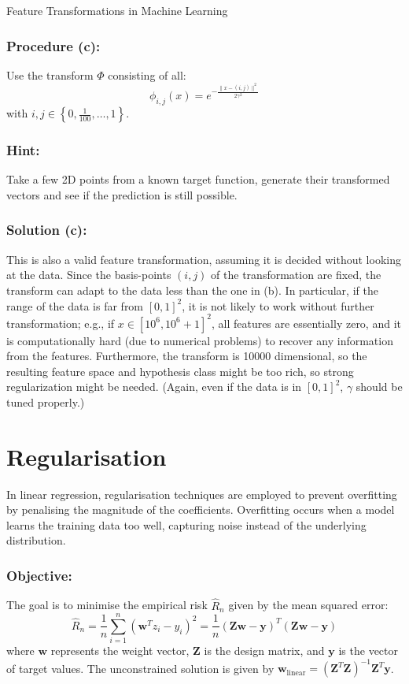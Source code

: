 \begin{examplebox}{Feature Transformations in Machine Learning}
\subsubsection*{Procedure (c):}
Use the transform $\Phi$ consisting of all:
\[
\phi_{i,j}(x) = e^{-\frac{\|x-(i,j)\|^2}{2\gamma^2}}
\]
with \(i, j \in \left\{0, \frac{1}{100}, \ldots, 1\right\}\).

\subsubsection*{Hint:}
Take a few 2D points from a known target function, generate their transformed vectors and see if the prediction is still possible.

\subsubsection*{Solution (c):}
This is also a valid feature transformation, assuming it is decided without looking at the data. Since the basis-points \((i, j)\) of the transformation are fixed, the transform can adapt to the data less than the one in (b). In particular, if the range of the data is far from \([0, 1]^2\), it is not likely to work without further transformation; e.g., if \(x \in [10^6, 10^6 + 1]^2\), all features are essentially zero, and it is computationally hard (due to numerical problems) to recover any information from the features. Furthermore, the transform is 10000 dimensional, so the resulting feature space and hypothesis class might be too rich, so strong regularization might be needed. (Again, even if the data is in \([0, 1]^2\), \(\gamma\) should be tuned properly.)


\end{examplebox}



\section{Regularisation}
In linear regression, regularisation techniques are employed to prevent overfitting by penalising the magnitude of the coefficients. Overfitting occurs when a model learns the training data too well, capturing noise instead of the underlying distribution.

\subsubsection*{Objective:}
The goal is to minimise the empirical risk $\hat{R}_n$ given by the mean squared error:
\[
\hat{R}_n = \frac{1}{n} \sum_{i=1}^n (\mathbf{w}^T z_i - y_i)^2 = \frac{1}{n} (\mathbf{Zw} - \mathbf{y})^T (\mathbf{Zw} - \mathbf{y})
\]
where $\mathbf{w}$ represents the weight vector, $\mathbf{Z}$ is the design matrix, and $\mathbf{y}$ is the vector of target values. The unconstrained solution is given by $\mathbf{w}_{\text{linear}} = (\mathbf{Z}^T \mathbf{Z})^{-1} \mathbf{Z}^T \mathbf{y}$.

